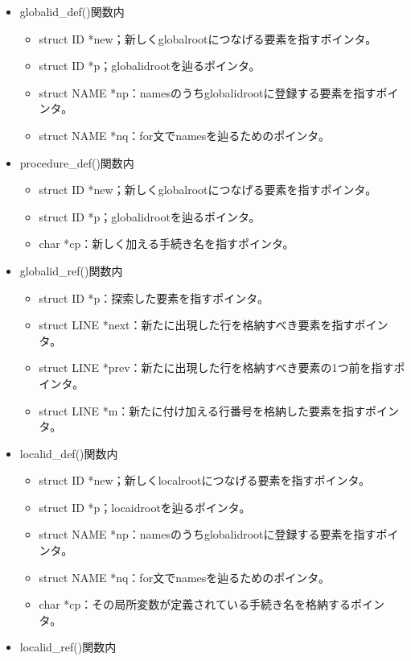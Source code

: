 \documentclass{jarticle}
\begin{document}
\begin{itemize}
\begin{itemize}
\begin{itemize}
    \end{itemize}
    \item globalid\_def()関数内
    \begin{itemize}
      \item struct ID *new；新しくglobalrootにつなげる要素を指すポインタ。
      \item struct ID *p；globalidrootを辿るポインタ。
      \item struct NAME *np：namesのうちglobalidrootに登録する要素を指すポインタ。
      \item struct NAME *nq：for文でnamesを辿るためのポインタ。
    \end{itemize}
    \item procedure\_def()関数内
    \begin{itemize}
      \item struct ID *new；新しくglobalrootにつなげる要素を指すポインタ。
      \item struct ID *p；globalidrootを辿るポインタ。
      \item char *cp：新しく加える手続き名を指すポインタ。
    \end{itemize}
    \item globalid\_ref()関数内
    \begin{itemize}
      \item struct ID *p：探索した要素を指すポインタ。
      \item struct LINE *next：新たに出現した行を格納すべき要素を指すポインタ。
      \item struct LINE *prev：新たに出現した行を格納すべき要素の1つ前を指すポインタ。
      \item struct LINE *m：新たに付け加える行番号を格納した要素を指すポインタ。
    \end{itemize}
    \item localid\_def()関数内
    \begin{itemize}
      \item struct ID *new；新しくlocalrootにつなげる要素を指すポインタ。
      \item struct ID *p；locaidrootを辿るポインタ。
      \item struct NAME *np：namesのうちglobalidrootに登録する要素を指すポインタ。
      \item struct NAME *nq：for文でnamesを辿るためのポインタ。
      \item char *cp：その局所変数が定義されている手続き名を格納するポインタ。
    \end{itemize}
    \item localid\_ref()関数内

\end{itemize}
\end{itemize}
\end{document}
